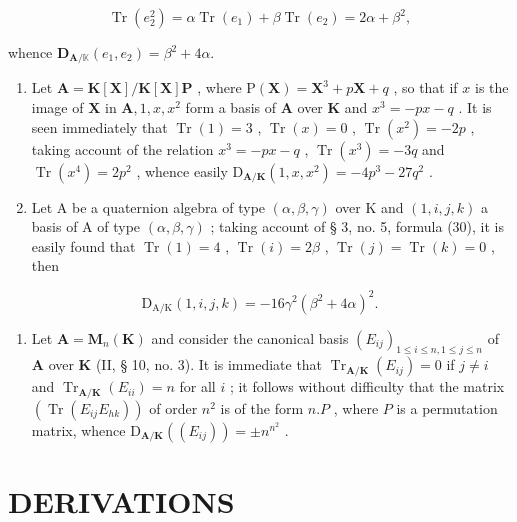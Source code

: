 \[
\operatorname{Tr} (e _ {2} ^ {2}) = \alpha \operatorname{Tr} (e _ {1}) + \beta \operatorname{Tr} (e _ {2}) = 2 \alpha + \beta^ {2},
\]

whence \(\mathbf{D}_{\mathbf{A} / \mathbb{K}}(e_1,e_2) = \beta^2 +4\alpha .\)

\begin{enumerate}
\def\labelenumi{(\arabic{enumi})}
\setcounter{enumi}{1}
\item
  Let \(\mathbf{A} = \mathbf{K}[\mathbf{X}] / \mathbf{K}[\mathbf{X}]\mathbf{P}\) , where \(\mathrm{P}(\mathbf{X}) = \mathbf{X}^3 + p\mathbf{X} + q\) , so that if \(x\) is the image of \(\mathbf{X}\) in \(\mathbf{A}, 1, x, x^2\) form a basis of \(\mathbf{A}\) over \(\mathbf{K}\) and \(x^3 = -px - q\) . It is seen immediately that \(\operatorname{Tr}(1) = 3\) , \(\operatorname{Tr}(x) = 0\) , \(\operatorname{Tr}(x^2) = -2p\) , taking account of the relation \(x^3 = -px - q\) , \(\operatorname{Tr}(x^3) = -3q\) and \(\operatorname{Tr}(x^4) = 2p^2\) , whence easily \(\mathrm{D}_{\mathbf{A} / \mathbf{K}}(1, x, x^2) = -4p^3 - 27q^2\) .
\item
  Let A be a quaternion algebra of type \((\alpha, \beta, \gamma)\) over K and \((1, i, j, k)\) a basis of A of type \((\alpha, \beta, \gamma)\) ; taking account of § 3, no. 5, formula (30), it is easily found that \(\operatorname{Tr}(1) = 4\) , \(\operatorname{Tr}(i) = 2\beta\) , \(\operatorname{Tr}(j) = \operatorname{Tr}(k) = 0\) , then
\end{enumerate}

\[
\mathrm{D} _ {\mathrm{A/K}} (1, i, j, k) = - 16 \gamma^ {2} (\beta^ {2} + 4 \alpha) ^ {2}.
\]

\begin{enumerate}
\def\labelenumi{(\arabic{enumi})}
\setcounter{enumi}{3}
\tightlist
\item
  Let \(\mathbf{A} = \mathbf{M}_n(\mathbf{K})\) and consider the canonical basis \((E_{ij})_{1\leqslant i\leqslant n,1\leqslant j\leqslant n}\) of \(\mathbf{A}\) over \(\mathbf{K}\) (II, § 10, no. 3). It is immediate that \(\operatorname{Tr}_{\mathbf{A} / \mathbf{K}}(E_{ij}) = 0\) if \(j\neq i\) and \(\operatorname{Tr}_{\mathbf{A} / \mathbf{K}}(E_{ii}) = n\) for all \(i\) ; it follows without difficulty that the matrix \((\operatorname{Tr}(E_{ij}E_{hk}))\) of order \(n^2\) is of the form \(n.P\) , where \(P\) is a permutation matrix, whence \(\mathrm{D}_{\mathbf{A} / \mathbf{K}}((E_{ij})) = \pm n^{n^2}\) .
\end{enumerate}

\section{DERIVATIONS}

